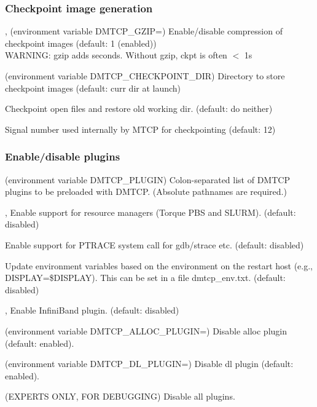 \subsubsection{Checkpoint image generation}
\begin{Description}
  \item[\Opt{--gzip}, \Opt{--no-gzip} (environment variable DMTCP_GZIP=\Lbr01\Rbr)]
    Enable/disable compression of checkpoint images (default: 1 (enabled))\\
    WARNING:  gzip adds seconds.  Without gzip, ckpt is often $<$ 1s
  \item[\OptSArg{--ckptdir}{path} (environment variable DMTCP_CHECKPOINT_DIR)]
    Directory to store checkpoint images (default: curr dir at launch)
  \item[\Opt{--checkpoint-open-files}]
    Checkpoint open files and restore old working dir. (default: do neither)
  \item[\OptSArg{--mtcp-checkpoint-signal}{signum}]
      Signal number used internally by MTCP for checkpointing (default: 12)
\end{Description}

\subsubsection{Enable/disable plugins}
\begin{Description}
  \item[\OptSArg{--with-plugin}{plugins} (environment variable DMTCP_PLUGIN)]
    Colon-separated list of DMTCP plugins to be preloaded with DMTCP.
    (Absolute pathnames are required.)
  \item[\Opt{--batch-queue}, \Opt{--rm}]
    Enable support for resource managers (Torque PBS and SLURM).
    (default: disabled)
  \item[\Opt{--ptrace}]
    Enable support for PTRACE system call for gdb/strace etc. (default: disabled)
  \item[\Opt{--modify-env}]
    Update environment variables based on the environment on the restart host
    (e.g., DISPLAY=\$DISPLAY).  This can be set in a file dmtcp_env.txt.
    (default: disabled)
  \item[\Opt{--ib}, \Opt{--infiniband}]
    Enable InfiniBand plugin. (default: disabled)
  \item[\Opt{--disable-alloc-plugin} (environment variable DMTCP_ALLOC_PLUGIN=\Lbr01\Rbr)]
    Disable alloc plugin (default: enabled).
  \item[\Opt{--disable-dl-plugin} (environment variable DMTCP_DL_PLUGIN=\Lbr01\Rbr)]
    Disable dl plugin (default: enabled).
  \item[\Opt{--disable-all-plugins} (EXPERTS ONLY, FOR DEBUGGING)]
    Disable all plugins.
\end{Description}

